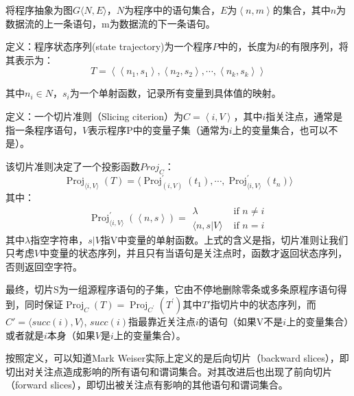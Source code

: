 将程序抽象为图$G\langle N,E\rangle$，$N$为程序中的语句集合，$E$为$\left\langle n,m \right\rangle$的集合，其中$n$为数据流的上一条语句，m为数据流的下一条语句。

定义：程序状态序列(state trajectory)为一个程序$P$中的，长度为$k$的有限序列，将其表示为：
$$T=\left\langle \left\langle n_{1},s_{1} \right\rangle, \left\langle n_{2},s_{2} \right\rangle , \cdots , \left\langle n_{k},s_{k} \right\rangle \right\rangle$$

其中$n_{i} \in N$，$s_i$为一个单射函数，记录所有变量到具体值的映射。

定义：一个切片准则（Slicing citerion）为$C=\left\langle i, V \right\rangle$，其中$i$指关注点，通常是指一条程序语句，$V$表示程序P中的变量子集（通常为$i$上的变量集合，也可以不是）。

该切片准则决定了一个投影函数$Proj_C$：
$$
\operatorname{Proj}_{\langle i, V\rangle}(T)=\langle\operatorname{Proj}_{(i, V)}^{\prime}\left(t_{1}\right) , \cdots, \operatorname{Proj}_{\langle i, V\rangle}^{\prime}\left(t_{n}\right) \rangle
$$
其中：
$$
\operatorname{Proj}_{\langle i, V\rangle}^{\prime}(\left\langle n, s \right\rangle)=\begin{array}{ll}
{\lambda} & {\text { if } n \neq i} \\
{\langle n, s | V \rangle} & {\text { if } n=i}
\end{array}
$$
其中$\lambda$指空字符串，$s|V$指V中变量的单射函数。上式的含义是指，切片准则让我们只考虑$V$中变量的状态序列，并且只有当语句是关注点时，函数才返回状态序列，否则返回空字符。

最终，切片S为一组源程序语句的子集，它由不停地删除零条或多条原程序语句得到，同时保证$\operatorname{Proj}_{C}(T)=\operatorname{Proj}_{C^{\prime}}\left(T^{\prime}\right)$其中$T'$指切片中的状态序列，而$C'=\langle succ(i), V \rangle$, $succ(i)$指最靠近关注点$i$的语句（如果V不是$i$上的变量集合）或者就是$i$本身（如果$ V $是$i$上的变量集合）。

按照定义，可以知道Mark Weiser实际上定义的是后向切片（backward slices），即切出对关注点造成影响的所有语句和谓词集合。对其改进后也出现了前向切片（forward slices），即切出被关注点有影响的其他语句和谓词集合。\\

